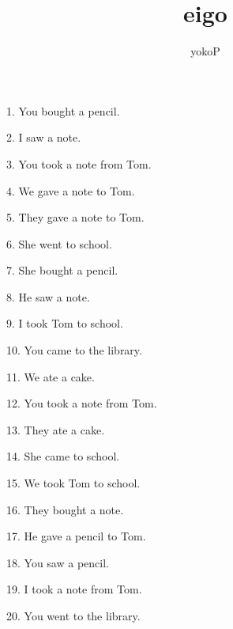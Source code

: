 \documentclass[uplatex,
paper=a4,
fontsize=18pt,
jafontsize=16pt,
number_of_lines=30,
line_length=30zh,
baselineskip=25pt,
]{jlreq}
\author{yokoP}
\title{eigo}
\begin{document}
1.  You bought a pencil.

2.  I saw a note.

3.  You took a note from Tom.

4.  We gave a note to Tom.

5.  They gave a note to Tom.

6.  She went to school.

7.  She bought a pencil.

8.  He saw a note.

9.  I took Tom to school.

10.  You came to the library.

11.  We ate a cake.

12.  You took a note from Tom.

13.  They ate a cake.

14.  She came to school.

15.  We took Tom to school.

16.  They bought a note.

17.  He gave a pencil to Tom.

18.  You saw a pencil.

19.  I took a note from Tom.

20.  You went to the library.
\end{document}
